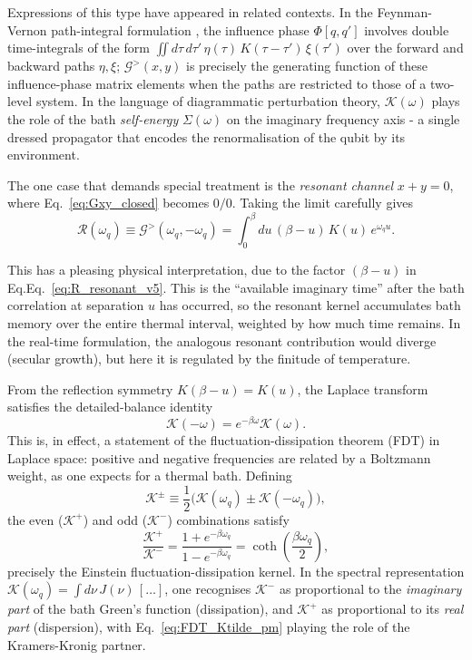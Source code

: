 Expressions of this type have appeared in related contexts.  In the Feynman-Vernon
path-integral formulation \cite{feynmanTheoryGeneralQuantum1963a}, the influence phase
$\Phi[q,q']$ involves double time-integrals of the form $\iint d\tau\,d\tau'\,
\eta(\tau)\,K(\tau-\tau')\,\xi(\tau')$ over the forward and backward paths
$\eta,\xi$; $\mathcal{G}^>(x,y)$ is precisely the generating function of these
influence-phase matrix elements when the paths are restricted to those of a
two-level system.  In the language of diagrammatic perturbation theory, $\mathcal{K}(\omega)$ plays the role of the bath \emph{self-energy}
$\Sigma(\omega)$ on the imaginary frequency axis - a single dressed propagator
that encodes the renormalisation of the qubit by its environment.

The one case that demands special treatment is the \emph{resonant channel}
$x+y=0$, where Eq.~\eqref{eq:Gxy_closed} becomes $0/0$.  Taking the limit carefully
gives
\begin{equation}
    \mathcal{R}(\omega_q)
    \equiv \mathcal{G}^>(\omega_q,-\omega_q)
    = \int_0^\beta du\,(\beta-u)\,K(u)\,e^{\omega_q u}.
    \label{eq:R_resonant_v5}
\end{equation}

This has a pleasing physical interpretation, due to the factor $(\beta-u)$ in Eq.Eq.~\eqref{eq:R_resonant_v5}. This is the ``available imaginary time'' after the bath correlation
at separation $u$ has occurred, so the resonant kernel accumulates bath memory
over the entire thermal interval, weighted by how much time remains.  In the
real-time formulation, the analogous resonant contribution would diverge (secular
growth), but here it is regulated by the finitude of temperature.

From the reflection symmetry $K(\beta-u)=K(u)$, the Laplace
transform satisfies the detailed-balance identity
\begin{equation}
    \mathcal{K}(-\omega)=e^{-\beta\omega}\mathcal{K}(\omega).
    \label{eq:Ktilde_detailed_balance_v5}
\end{equation}
This is, in effect, a statement of the fluctuation-dissipation theorem (FDT) in
Laplace space: positive and negative frequencies are related by a Boltzmann
weight, as one expects for a thermal bath.  Defining
\begin{equation}
    \mathcal{K}^\pm \equiv \frac{1}{2}\bigl(\mathcal{K}(\omega_q)\pm\mathcal{K}(-\omega_q)\bigr),
    \label{eq:Ktilde_pm}
\end{equation}
the even ($\mathcal{K}^+$) and odd ($\mathcal{K}^-$) combinations satisfy
\begin{equation}
    \frac{\mathcal{K}^+}{\mathcal{K}^-}
    = \frac{1+e^{-\beta\omega_q}}{1-e^{-\beta\omega_q}}
    = \coth\!\left(\frac{\beta\omega_q}{2}\right),
    \label{eq:FDT_Ktilde_pm}
\end{equation}
precisely the Einstein fluctuation-dissipation kernel.  In the spectral
representation $\mathcal{K}(\omega_q)=\int d\nu\,J(\nu)\,[\dots]$, one recognises
$\mathcal{K}^{-}$ as proportional to the \emph{imaginary part} of the bath Green's
function (dissipation), and $\mathcal{K}^{+}$ as proportional to its \emph{real
part} (dispersion), with Eq.~\eqref{eq:FDT_Ktilde_pm} playing the role of the
Kramers-Kronig partner.

